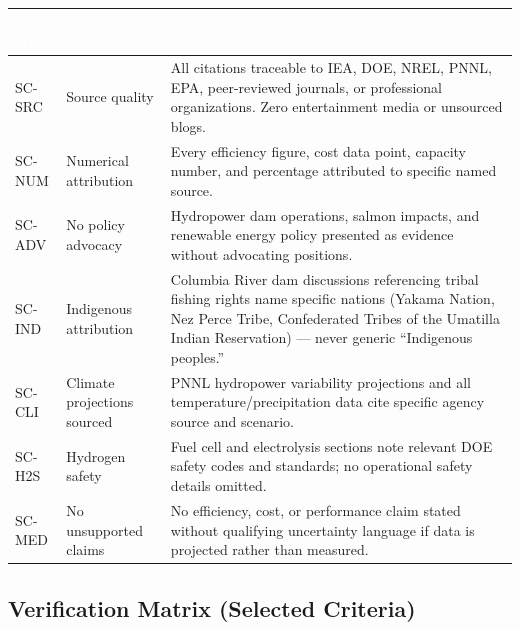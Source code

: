 \documentclass[11pt,letterpaper]{article}
\newcommand{\tableheader}[1]{\textbf{\sffamily\textcolor{white}{#1}}}
\begin{document}
\begin{center}
\begin{tabularx}{\textwidth}{C{1.5cm}L{4cm}X}
\toprule
{}
\tableheader{Test ID} & \tableheader{Verifies} & \tableheader{Expected Behavior} \\
\midrule
SC-SRC & Source quality & All citations traceable to IEA, DOE, NREL, PNNL, EPA, peer-reviewed journals, or professional organizations. Zero entertainment media or unsourced blogs. \\
SC-NUM & Numerical attribution & Every efficiency figure, cost data point, capacity number, and percentage attributed to specific named source. \\
SC-ADV & No policy advocacy & Hydropower dam operations, salmon impacts, and renewable energy policy presented as evidence without advocating positions. \\
SC-IND & Indigenous attribution & Columbia River dam discussions referencing tribal fishing rights name specific nations (Yakama Nation, Nez Perce Tribe, Confederated Tribes of the Umatilla Indian Reservation) — never generic ``Indigenous peoples.'' \\
SC-CLI & Climate projections sourced & PNNL hydropower variability projections and all temperature/precipitation data cite specific agency source and scenario. \\
SC-H2S & Hydrogen safety & Fuel cell and electrolysis sections note relevant DOE safety codes and standards; no operational safety details omitted. \\
SC-MED & No unsupported claims & No efficiency, cost, or performance claim stated without qualifying uncertainty language if data is projected rather than measured. \\
\bottomrule
\end{tabularx}
\end{center}

\subsection{Verification Matrix (Selected Criteria)}
\end{document}
